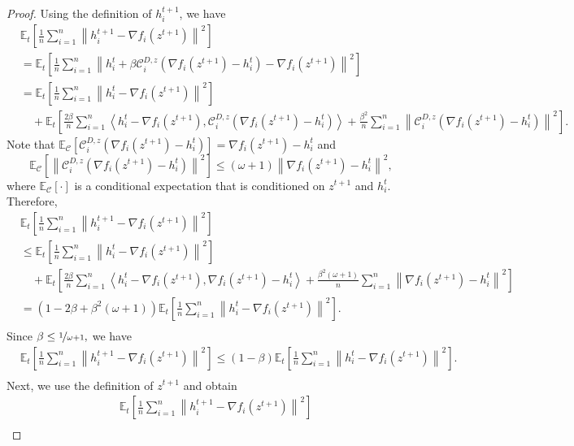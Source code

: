 \documentclass{article} %
\newcommand{\norm}[1]{\left\| #1 \right\|}
\newcommand{\inp}[2]{\left\langle#1,#2\right\rangle} %
\newcommand{\ExpSub}[2]{{\mathbb{E}}_{#1}\left[#2\right]}
\newcommand{\cC}{\mathcal{C}}
\theoremstyle{plain}
\theoremstyle{definition}
\theoremstyle{remark}
\begin{document}
\begin{proof}
  Using the definition of $h^{t+1}_i$, we have
  \begin{align*}
    &\ExpSub{t}{\frac{1}{n}\sum_{i=1}^n \norm{h_i^{t+1} - \nabla f_i(z^{t+1})}^2} \\
    &=\ExpSub{t}{\frac{1}{n}\sum_{i=1}^n \norm{h_i^{t} + \beta \cC_i^{D, z}(\nabla f_i(z^{t+1}) - h_i^t) - \nabla f_i(z^{t+1})}^2} \\
    &=\ExpSub{t}{\frac{1}{n}\sum_{i=1}^n \norm{h^{t}_i - \nabla f_i(z^{t+1})}^2} \\
    &\quad + \ExpSub{t}{\frac{2 \beta}{n}\sum_{i=1}^n \inp{h^{t}_i - \nabla f_i(z^{t+1})}{\cC_i^{D, z}(\nabla f_i(z^{t+1}) - h_i^t)} + \frac{\beta^2}{n}\sum_{i=1}^n \norm{\cC_i^{D, z}(\nabla f_i(z^{t+1}) - h_i^t)}^2}.
  \end{align*}
  Note that $\ExpSub{\cC}{\cC_i^{D, z}(\nabla f_i(z^{t+1}) - h_i^t)} = \nabla f_i(z^{t+1}) - h_i^t$ and $$\ExpSub{\cC}{\norm{\cC_i^{D, z}(\nabla f_i(z^{t+1}) - h_i^t)}^2} \leq \left(\omega + 1\right)\norm{\nabla f_i(z^{t+1}) - h_i^t}^2,$$
  where $\ExpSub{\cC}{\cdot}$ is a conditional expectation that is conditioned on $z^{t+1}$ and $h^t_i.$ Therefore, 
  \begin{align*}
    &\ExpSub{t}{\frac{1}{n}\sum_{i=1}^n \norm{h_i^{t+1} - \nabla f_i(z^{t+1})}^2} \\
    &\leq\ExpSub{t}{\frac{1}{n}\sum_{i=1}^n \norm{h^{t}_i - \nabla f_i(z^{t+1})}^2} \\
    &\quad + \ExpSub{t}{\frac{2 \beta}{n}\sum_{i=1}^n \inp{h^{t}_i - \nabla f_i(z^{t+1})}{\nabla f_i(z^{t+1}) - h_i^t} + \frac{\beta^2 (\omega + 1)}{n}\sum_{i=1}^n \norm{\nabla f_i(z^{t+1}) - h_i^t}^2} \\
    &=\left(1 - 2 \beta + \beta^2 (\omega + 1)\right)\ExpSub{t}{\frac{1}{n}\sum_{i=1}^n \norm{h^{t}_i - \nabla f_i(z^{t+1})}^2}. \\
  \end{align*}
  Since $\beta \leq \nicefrac{1}{\omega + 1},$ we have
  \begin{align*}
    &\ExpSub{t}{\frac{1}{n}\sum_{i=1}^n \norm{h_i^{t+1} - \nabla f_i(z^{t+1})}^2} \leq\left(1 - \beta\right)\ExpSub{t}{\frac{1}{n}\sum_{i=1}^n \norm{h^{t}_i - \nabla f_i(z^{t+1})}^2}. \\
  \end{align*}
  Next, we use the definition of $z^{t+1}$ and obtain
  \begin{align*}
    &\ExpSub{t}{\frac{1}{n}\sum_{i=1}^n \norm{h_i^{t+1} - \nabla f_i(z^{t+1})}^2} \\

\end{align*}
\end{proof}
\end{document}

